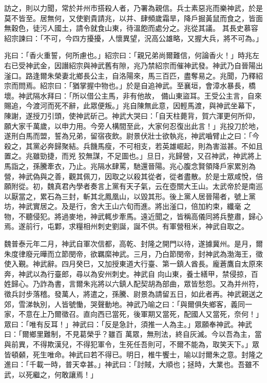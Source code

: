 \begin{pinyinscope}
 訪之，則以力聞，常於并州市搭殺人者，乃署為親信。兵士素惡兆而樂神武，於是莫不皆至。居無何，又使劉貴請兆，以并、肆頻歲霜旱，降戶掘黃鼠而食之，皆面無穀色，徒污人國土，請令就食山東，待溫飽而處分之。兆從其議。
 其長史慕容紹宗諫曰：「不可，今四方擾擾，人懷異望，況高公雄略，又握大兵，將不可為。」



 兆曰：「香火重誓，何所慮也。」紹宗曰：「親兄弟尚爾難信，何論香火！」時兆左右已受神武金，因譖紹宗與神武舊有隙，兆乃禁紹宗而催神武發。神武乃自晉陽出滏口。路逢爾朱榮妻北鄉長公主，自洛陽來，馬三百匹，盡奪易之。兆聞，乃釋紹宗而問焉。紹宗曰：「猶掌握中物也。」於是自追神武。至襄垣，會漳水暴長，橋壞。神武隔水拜曰：「所以借公主馬，非有他故，
 備山東盜耳。王受公主言，自來賜追，今渡河而死不辭，此眾便叛。」兆自陳無此意，因輕馬渡，與神武坐幕下，陳謝，遂授刀引頭，使神武斫己。神武大哭曰：「自天柱薨背，賀六渾更何所仰，願大家千萬歲，以申力用。今旁人構間至此，大家何忍復出此言！」兆投刀於地，遂刑白馬而盟，誓為兄弟，留宿夜飲。尉景伏壯士欲執兆，神武嚙臂止之曰：「今殺之，其黨必奔歸聚結。兵饑馬瘦，不可相支，若英雄崛起，則為害滋甚。不如且置之。兆雖勁捷，而兇
 狡無謀，不足圖也。」旦日，兆歸營，又召神武，神武將上馬詣之，孫騰牽衣，乃止。兆隔水肆罵，馳還晉陽。兆心腹念賢領降戶家累別為營，神武偽與之善，觀其佩刀，因取之以殺其從者，從者盡散。於是士眾咸悅，倍願附從。初，魏真君內學者奏言上黨有天子氣，云在壺關大王山。太武帝於是南巡以厭當之，累石為三封，斬其北鳳凰山，以毀其形。後上黨人居晉陽者，號上黨坊，神武實居之。及是行，舍大王山六旬而進。將出滏口，倍加約束，纖毫
 之物，不聽侵犯。將過麥地，神武輒步牽馬。遠近聞之，皆稱高儀同將兵整肅，歸心焉。遂前行，屯鄴，求糧相州刺史劉誕，誕不供。有軍營租米，神武自取之。



 魏普泰元年二月，神武自軍次信都，高乾、封隆之開門以待，遂據冀州。是月，爾朱度律廢元曄而立節閔帝，欲羈縻神武。三月，乃白節閔帝，封神武為渤海王，徵使入覲。神武辭。四月癸巳，又加授東道大行臺、第一鎮人酋長。龐蒼鷹自太原來奔，神武以為行臺郎，尋以為安州刺史。神武自
 向山東，養士繕甲，禁侵掠，百姓歸心。乃詐為書，言爾朱兆將以六鎮人配契胡為部曲，眾皆愁怨。又為并州符，徵兵討步落稽。發萬人，將遣之，孫騰、尉景為請留五日，如此者再。神武親送之郊，雪涕執別，人皆號慟，哭聲動地。神武乃喻之曰：「與爾俱失鄉客，義同一家，不意在上乃爾徵召。直向西已當死，後軍期又當死，配國人又當死，奈何！」眾曰：「唯有反耳！」神武曰：「反是急計，須推一人為主。」眾願奉神武。神武曰：「爾鄉里難制，不見葛榮乎？雖百
 萬眾，無刑法，終自灰滅。今以吾為主，當與前異，不得欺漢兒，不得犯軍令，生死任吾則可，不爾不能為，取笑天下。」眾皆頓顙，死生唯命。神武曰若不得已。明日，椎牛饗士，喻以討爾朱之意。封隆之進曰：「千載一時，普天幸甚。」神武曰：「討賊，大順也；拯時，大業也。吾雖不武，以死繼之，何敢讓焉！」




\end{pinyinscope}
